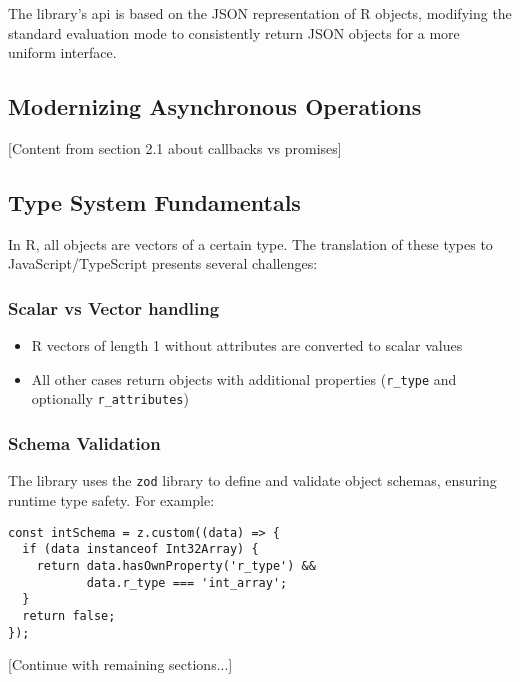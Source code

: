 \documentclass{article}
\newcommand{\pkg}[1]{\texttt{#1}}
\newcommand{\cmd}[1]{\texttt{#1}}
\newcommand{\prog}[1]{{\sf #1}}
\newcommand{\R}{\prog{R}}
\begin{document}
The library's \gls{api} is based on the JSON representation of \R{} objects, modifying the standard evaluation mode to consistently return JSON objects for a more uniform interface.

\subsection{Modernizing Asynchronous Operations}
\label{sec:async}

[Content from section 2.1 about callbacks vs promises]

\subsection{Type System Fundamentals}
\label{sec:type-system}

In \R{}, all objects are vectors of a certain type. The translation of these types to JavaScript/TypeScript presents several challenges:

\subsubsection{Scalar vs Vector handling}
\label{sec:scalar-vector}

\begin{itemize}
    \item \R{} vectors of length 1 without attributes are converted to scalar values
    \item All other cases return objects with additional properties (\cmd{r\_type} and optionally \cmd{r\_attributes})
\end{itemize}

\subsubsection{Schema Validation}
\label{sec:validation}

The library uses the \pkg{zod} library to define and validate object schemas, ensuring runtime type safety. For example:

\begin{lstlisting}
const intSchema = z.custom((data) => {
  if (data instanceof Int32Array) {
    return data.hasOwnProperty('r_type') &&
           data.r_type === 'int_array';
  }
  return false;
});
\end{lstlisting}


[Continue with remaining sections...]
\end{document}
